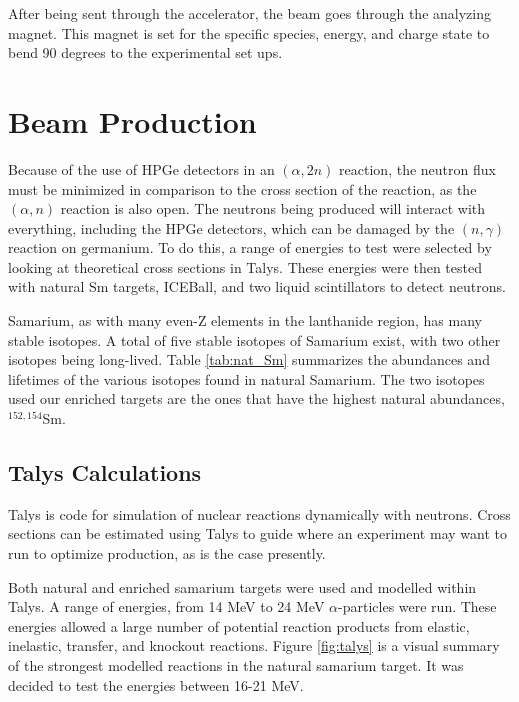 

After being sent through the accelerator, the beam goes through the analyzing magnet. This magnet is set for the specific species, energy, and charge state to bend 90 degrees to the experimental set ups.

\section{Beam Production}

Because of the use of HPGe detectors in an $(\alpha,2n)$ reaction, the neutron flux must be minimized in comparison to the cross section of the reaction, as the $(\alpha,n)$ reaction is also open. The neutrons being produced will interact with everything, including the HPGe detectors, which can be damaged by the $(n,\gamma)$ reaction on germanium. To do this, a range of energies to test were selected by looking at theoretical cross sections in Talys\citep{koning07:_talys}. These energies were then tested with natural Sm targets, ICEBall, and two liquid scintillators to detect neutrons.

Samarium, as with many even-Z elements in the lanthanide region, has many stable isotopes. A total of five stable isotopes of Samarium exist, with two other isotopes being long-lived. Table \ref{tab:nat_Sm} summarizes the abundances and lifetimes of the various isotopes found in natural Samarium. The two isotopes used our enriched targets are the ones that have the highest natural abundances, $^{152,154}$Sm.



\subsection{Talys Calculations}

Talys \citep{koning07:_talys} is code for simulation of nuclear reactions dynamically with neutrons. Cross sections can be estimated using Talys to guide where an experiment may want to run to optimize production, as is the case presently. 

Both natural and enriched samarium targets were used and modelled within Talys. A range of energies, from 14 MeV to 24 MeV $\alpha$-particles were run. These energies allowed a large number of potential reaction products from elastic, inelastic, transfer, and knockout reactions. Figure \ref{fig:talys} is a visual summary of the strongest modelled reactions in the natural samarium target. It was decided to test the energies between 16-21 MeV.

